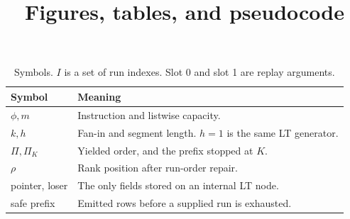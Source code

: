 \documentclass[sigconf,nonacm]{acmart}
\begin{document}
\title{Figures, tables, and pseudocode}
\renewcommand{\shortauthors}{Layout preview}
\onecolumn
{}\par
\vspace{0.4em}


\begin{table}[t]
\caption{Symbols. $I$ is a set of run indexes. Slot 0 and slot 1 are replay arguments.}
\centering\footnotesize
\begin{tabular}{@{}lp{}@{}}
\toprule
Symbol & Meaning \\
\midrule
$\phi,m$ & Instruction and listwise capacity. \\
$k,h$ & Fan-in and segment length. $h{=}1$ is the same LT generator. \\
$\Pi,\Pi_K$ & Yielded order, and the prefix stopped at $K$. \\
$\rho$ & Rank position after run-order repair. \\
pointer, loser & The only fields stored on an internal LT node. \\
safe prefix & Emitted rows before a supplied run is exhausted. \\
\bottomrule
\end{tabular}
\end{table}
\end{document}
